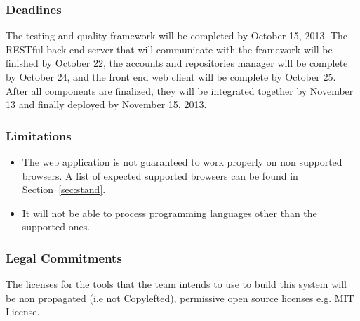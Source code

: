 \subsubsection*{Deadlines}

The testing and quality framework will be completed by October 15, 2013. The
RESTful back end server that will communicate with the framework will be
finished by October 22, the accounts and repositories manager will be complete
by October 24, and the front end web client will be complete by October 25.
After all components are finalized, they will be integrated together by November
13 and finally deployed by November 15, 2013.

\subsubsection{Limitations}
\begin{itemize}
\item The web application is not guaranteed to work properly on non supported
browsers. A list of expected supported browsers can be found in Section~\ref{sec:stand}.
\item It will not be able to process programming languages other than the
supported ones.
\end{itemize}

\subsubsection{Legal Commitments}

The licenses for the tools that the team intends to use to build this system
will be non propagated (i.e not Copylefted), permissive open source licenses
e.g. MIT License.